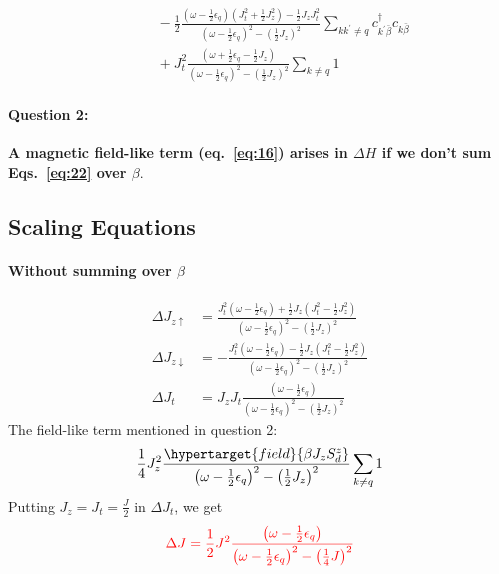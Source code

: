 \documentclass[14pt]{extarticle}
\newcommand{\qs}[1]{\textbf{{\textcolor{botgreen}{#1}}}}
\numberwithin{equation}{section}
\begin{document}
\begin{subequations}
\begin{align}
&\hspace{30pt} - \frac{1}{2} \frac{\left( \omega -\frac{1}{2}\epsilon_q  \right) \left( J_t^2 + \frac{1}{2} J_z^2 \right) - \frac{1}{2} J_zJ_t^2}{\left( \omega -\frac{1}{2}\epsilon_q  \right)^2 - \left( \frac{1}{2}J_z \right)^2} \sum\limits_{kk^{\prime}\ne q} c^{\dag}_{k^{\prime}\bar{\beta}} c_{k\bar{\beta}}  \nonumber\\
                                                                                         &\hspace{30pt} + J_t^2 \frac{\left( \omega + \frac{1}{2}\epsilon_q - \frac{1}{2} J_z \right)}{\left( \omega -\frac{1}{2}\epsilon_q  \right)^2 - \left( \frac{1}{2}J_z \right)^2} \sum\limits_{k\ne q} 1 \label{eq:19} 
\end{align}
\end{subequations}
\paragraph{Question 2:}\hypertarget{q2}{\qs{A magnetic field-like term (eq.~\eqref{eq:16}) arises in $\Delta H$ if we don't sum Eqs.~\eqref{eq:22}  over $\beta$}.}

\subsection{Scaling Equations}
\paragraph{Without summing over \(\beta\)}
\begin{equation}\begin{aligned}
	\Delta J_{z \uparrow} &= \frac{J_t^2 \left( \omega - \frac{1}{2}\epsilon_q \right)+ \frac{1}{2} J_z \left( J_t^2 - \frac{1}{2}J_z^2 \right)}{\left( \omega -\frac{1}{2}\epsilon_q  \right)^2 - \left( \frac{1}{2}J_z \right)^2}\\
	\Delta J_{z \downarrow} &= -\frac{J_t^2 \left( \omega - \frac{1}{2}\epsilon_q \right) - \frac{1}{2} J_z \left( J_t^2 - \frac{1}{2}J_z^2 \right)}{\left( \omega -\frac{1}{2}\epsilon_q  \right)^2 - \left( \frac{1}{2}J_z \right)^2}\\
	\Delta J_t &= J_zJ_t \frac{\left( \omega -\frac{1}{2}\epsilon_q  \right)}{\left( \omega -\frac{1}{2}\epsilon_q  \right)^2 - \left( \frac{1}{2}J_z \right)^2}
\end{aligned}\end{equation}
{\color{red}The field-like term mentioned in question 2:}
\begin{equation}\begin{aligned}
\frac{1}{4} J_z^2 \frac{\hypertarget{field}{\beta J_z S_d^z}}{\left( \omega -\frac{1}{2}\epsilon_q  \right)^2 - \left( \frac{1}{2}J_z \right)^2} \sum\limits_{k\ne q} 1
\end{aligned}\end{equation}
Putting \(J_z = J_t = \frac{J}{2}\) in \(\Delta J_t\), we get
\hypertarget{q4}{\begin{align}
	\label{q4}
	\color{red}{\Delta J = \frac{1}{2}J^2 \frac{\left( \omega - \frac{1}{2}\epsilon_q \right)}{\left( \omega - \frac{1}{2}\epsilon_q \right)^2 - \left( \frac{1}{4} J \right)^2}}
\end{align}}
\end{document}
